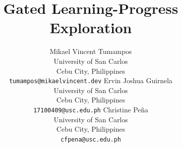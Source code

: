 \documentclass{article}
\title{Gated Learning-Progress Exploration}
\author{Mikael Vincent Tumampos\\
University of San Carlos\\
Cebu City, Philippines\\
\texttt{tumampos@mikaelvincent.dev}
\And
Ervin Joshua Guirnela\\
University of San Carlos\\
Cebu City, Philippines\\
\texttt{17100409@usc.edu.ph}
\And
Christine Pe\~na\\
University of San Carlos\\
Cebu City, Philippines\\
\texttt{cfpena@usc.edu.ph}
}
\begin{document}
\maketitle



\FloatBarrier



\end{document}
